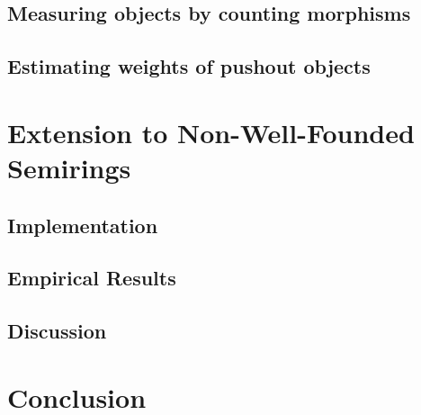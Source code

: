 \documentclass{report}
\begin{document}
\subsection{Measuring objects by counting morphisms}
\label{sec:type_graph:wf:measuring_graphs}

  
\subsection{Estimating weights of pushout objects} 
\label{sec:type_graph:wf:weighing_pushout} 
   

    
  
\section{Extension to Non-Well-Founded Semirings}


 

\subsection{Implementation}
\label{sec:type_graph:implementation}
 

\subsection{Empirical Results}
\label{sec:type_graph:result}
 

\subsection{Discussion}
\label{sec:type_graph:related_work}


\section{Conclusion}
\label{sec:type_graph:conclusion}

\end{document}
